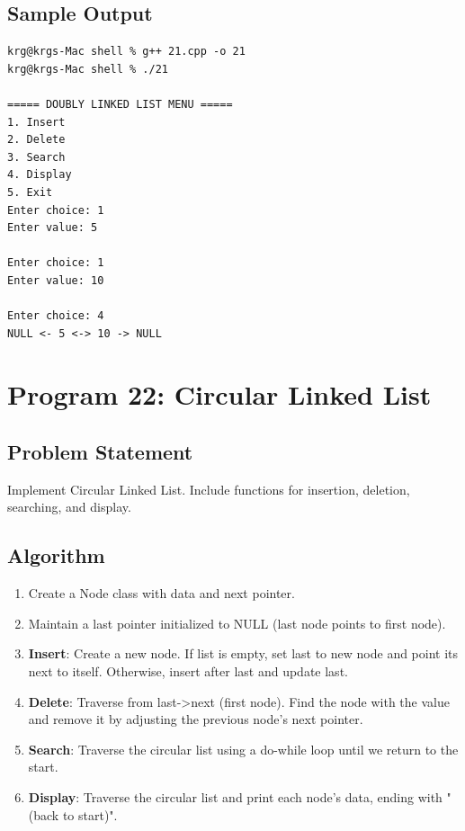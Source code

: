 \documentclass[a4paper,12pt]{article}
\begin{document}
\subsection*{Sample Output}
\begin{lstlisting}[style=outputstyle]
krg@krgs-Mac shell % g++ 21.cpp -o 21
krg@krgs-Mac shell % ./21

===== DOUBLY LINKED LIST MENU =====
1. Insert
2. Delete
3. Search
4. Display
5. Exit
Enter choice: 1
Enter value: 5

Enter choice: 1
Enter value: 10

Enter choice: 4
NULL <- 5 <-> 10 -> NULL
\end{lstlisting}

\newpage

\section*{Program 22: Circular Linked List}

\subsection*{Problem Statement}
Implement Circular Linked List. Include functions for insertion, deletion, searching, and display.

\subsection*{Algorithm}
\begin{enumerate}
    \item Create a Node class with data and next pointer.
    \item Maintain a last pointer initialized to NULL (last node points to first node).
    \item \textbf{Insert}: Create a new node. If list is empty, set last to new node and point its next to itself. Otherwise, insert after last and update last.
    \item \textbf{Delete}: Traverse from last->next (first node). Find the node with the value and remove it by adjusting the previous node's next pointer.
    \item \textbf{Search}: Traverse the circular list using a do-while loop until we return to the start.
    \item \textbf{Display}: Traverse the circular list and print each node's data, ending with "(back to start)".
\end{enumerate}
\end{document}
